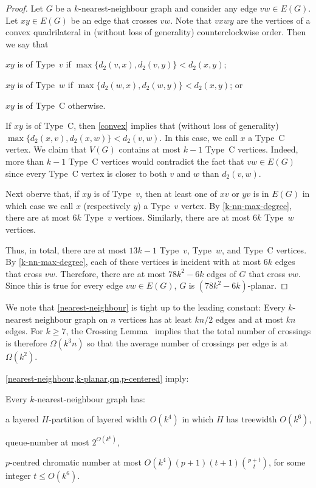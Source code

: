 \documentclass{patmorin}
\renewcommand{\ge}{\geqslant}
\renewcommand{\leq}{\leqslant}
\begin{document}
\begin{proof}
  Let $G$ be a $k$-nearest-neighbour graph and consider any edge $vw\in E(G)$.
  Let $xy\in E(G)$ be an edge that crosses $vw$.  Note that $vxwy$ are the vertices of a convex quadrilateral in (without loss of generality) counterclockwise order. Then we say that 
  \begin{compactenum}
    \item $xy$ is of Type~$v$ if $\max\{d_2(v,x), d_2(v,y)\}< d_2(x,y)$;
    \item $xy$ is of Type~$w$ if $\max\{d_2(w,x), d_2(w,y)\}< d_2(x,y)$; or
    \item $xy$ is of Type~C otherwise.
  \end{compactenum}
  If $xy$ is of Type~C, then \cref{convex} implies that (without loss of generality) $\max\{d_2(x,v),d_2(x,w)\} < d_2(v,w)$.  In this case, we call $x$ a Type~C vertex.  We claim that $V(G)$ contains at most $k-1$ Type~C vertices.  Indeed, more than $k-1$ Type~C vertices would contradict the fact that $vw\in E(G)$ since every Type~C vertex is closer to both $v$ and $w$ than $d_2(v,w)$.
  
  Next oberve that, if $xy$ is of Type~$v$, then at least one of $xv$ or $yv$ is in $E(G)$ in which case we call $x$ (respectively $y$) a Type~$v$ vertex.  By \cref{k-nn-max-degree}, there are at most $6k$ Type~$v$ vertices.  Similarly, there are at most $6k$ Type~$w$ vertices.
  
  Thus, in total, there are at most $13k-1$ Type~$v$, Type~$w$, and Type~C vertices. By \cref{k-nn-max-degree}, each of these vertices is incident with at most $6k$ edges that cross $vw$. Therefore, there are at most $78k^2-6k$ edges of $G$ that cross $vw$.  Since this is true for every edge $vw\in E(G)$, $G$ is $(78k^2-6k)$-planar.
\end{proof}

We note that \cref{nearest-neighbour} is tight up to the leading constant:  Every $k$-nearest neighbour graph on $n$ vertices has at least $kn/2$ edges and at most $kn$ edges.  For $k\ge 7$, the Crossing Lemma~\citep{ajtai.chvatal.ea:crossing-free,leighton:complexity} implies that the total number of crossings is therefore $\Omega(k^3n)$ so that the average number of crossings per edge is at $\Omega(k^2)$.

\cref{nearest-neighbour,k-planar,qn,p-centered} imply:

\begin{cor}
\label{k-nn}
Every $k$-nearest-neighbour graph has:
\begin{compactitem}
\item a layered $H$-partition of layered width $O(k^4)$ in which $H$ has treewidth $O(k^6)$,
\item queue-number at most $2^{O(k^6)}$,
\item $p$-centred chromatic number at most $O(k^4) (p+1) (t+1)\binom{p+t}{t}$, for some integer $t\leq O(k^6)$.
\end{compactitem}
\end{cor}
\end{document}
